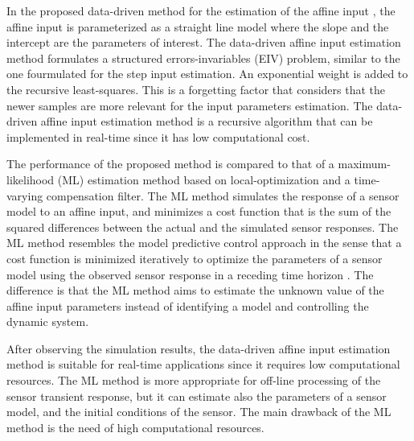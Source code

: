 In the proposed data-driven method for the estimation of the affine input \citep{QuintanaMEAS},
the affine input is parameterized as a straight line model where the slope and the intercept are the parameters of interest.
The data-driven affine input estimation method formulates a structured errors-invariables (EIV) problem, similar to the one fourmulated for the step input estimation.
An exponential weight is added to the recursive least-squares.
This is a forgetting factor that considers that the newer samples are more relevant for the input parameters estimation.
The data-driven affine input estimation method is a recursive algorithm that can be implemented in real-time since it has low computational cost.

The performance of the proposed method is compared to that of a maximum-likelihood (ML) estimation method based on local-optimization and a time-varying compensation filter.
The ML method simulates the response of a sensor model to an affine input, and minimizes a cost function that is the sum of the squared differences between the actual and the simulated sensor responses. 
The ML method resembles the model predictive control approach in the sense that a cost function is minimized iteratively to optimize the parameters of a sensor model using the observed sensor response in a receding time horizon \citep{Mayne14}.
The difference is that the ML method aims to estimate the unknown value of the affine input parameters instead of identifying a model and controlling the dynamic system. 
 
After observing the simulation results, the data-driven affine input estimation method is suitable for real-time applications since it requires low computational resources. 
The ML method is more appropriate for off-line processing of the sensor transient response, but
it can estimate also the parameters of a sensor model, and the initial conditions of the sensor.
The main drawback of the ML method is the need of high computational resources.


 
\newpage
